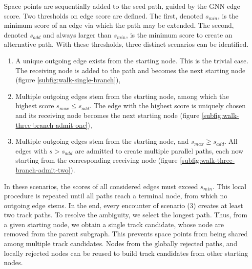 Space points are sequentially added to the seed path, guided by the GNN edge score.
Two thresholds on edge score are defined.
The first, denoted $s_{min}$, is the minimum score of an edge via which the path may be extended.
The second, denoted $s_{add}$ and always larger than $s_{min}$, is the minimum score to create an alternative path.
With these thresholds, three distinct scenarios can be identified.
\begin{enumerate}
    \item A unique outgoing edge exists from the starting node. This is the trivial case. The receiving node is added to the path and becomes the next starting node (figure \ref{subfig:walk-single-branch}),
    \item Multiple outgoing edges stem from the starting node, among which the highest score $s_{max} \le s_{add}$. The edge with the highest score is uniquely chosen and its receiving node becomes the next starting node (figure \ref{subfig:walk-three-branch-admit-one}),
    \item Multiple outgoing edges stem from the starting node, and $s_{max} \ge s_{add}$. All edges with $s>s_{add}$ are admitted to create multiple parallel paths, each now starting from the corresponding receiving node (figure \ref{subfig:walk-three-branch-admit-two}).
\end{enumerate}
In these scenarios, the scores of all considered edges must exceed $s_{min}$.
This local procedure is repeated until all paths reach a terminal node, from which no outgoing edge stems.
In the end, every encounter of scenario (3) creates at least two track paths. 
To resolve the ambiguity, we select the longest path. 
Thus, from a given starting node, we obtain a single track candidate, whose node are removed from the parent subgraph.
This prevents space points from being shared among multiple track candidates.
Nodes from the globally rejected paths, and locally rejected nodes can be reused to build track candidates from other starting nodes.



